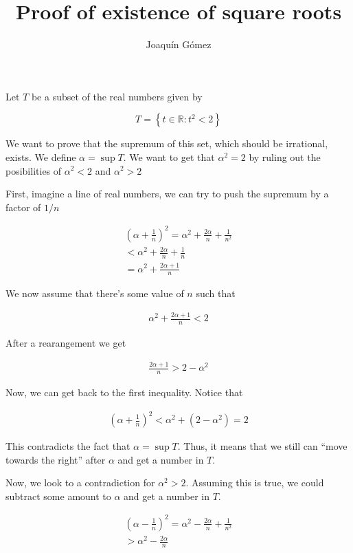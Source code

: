 \documentclass{article}
\title{Proof of existence of square roots}
\author{Joaquín Gómez}
\begin{document}
\maketitle

Let $T$ be a subset of the real numbers given by

\[
    T=\left\{
    t\in \mathbb R : t^2 < 2
    \right\}
\]

We want to prove that the supremum of this set, which should be irrational,
exists. We define $\alpha=\sup T$. We want to get that $\alpha^2 = 2$ by ruling
out the posibilities of $\alpha^{2} < 2$ and $\alpha^{2} > 2$

First, imagine a line of real numbers, we can try to push the supremum by a
factor of $1/n$

\begin{align*}
    \left(\alpha + \frac{1}{n}\right)^2 = \alpha^{2} + \frac{2\alpha}{n} + \frac{1}{n^{2}}
    \\< \alpha^{2} + \frac{2\alpha}{n} + \frac{1}{n}
    \\=\alpha^{2} + \frac{2\alpha + 1}{n}
\end{align*}

We now assume that there's some value of $n$ such that

\begin{align*}
    \alpha^{2} + \frac{2\alpha + 1}{n} < 2
\end{align*}

After a rearangement we get

\begin{align*}
    \frac{2\alpha + 1}{n} > 2 - \alpha^{2}
\end{align*}

Now, we can get back to the first inequality. Notice that

\begin{align*}
    \left(\alpha + \frac{1}{n}\right)^2 < \alpha^{2} + (2-\alpha^{2}) = 2
\end{align*}

This contradicts the fact that $\alpha = \sup T$. Thus, it means that we still
can ``move towards the right'' after $\alpha$ and get a number in $T$.

Now, we look to a contradiction for $\alpha^{2} > 2$. Assuming this is true, we
could subtract some amount to $\alpha$ and get a number in $T$.

\begin{align*}
    \left(\alpha - \frac{1}{n}\right)^{2} = \alpha^{2} - \frac{2\alpha}{n} + \frac{1}{n^{2}}
    \\>\alpha^{2} - \frac{2\alpha}{n}
\end{align*}
\end{document}
